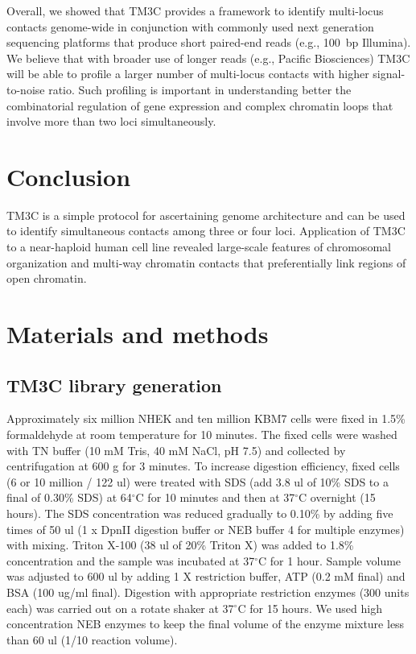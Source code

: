 Overall, we showed that TM3C provides a framework to identify multi-locus
contacts genome-wide in conjunction with commonly used next generation sequencing
platforms that produce short paired-end reads (e.g., 100~bp Illumina).
We believe that with broader use of longer reads (e.g., Pacific Biosciences)
TM3C will be able to profile a larger number of multi-locus contacts
with higher signal-to-noise ratio. Such profiling is important in
understanding better the combinatorial regulation of gene expression
and complex chromatin loops that involve more than
two loci simultaneously.

\section{Conclusion}

TM3C is a simple protocol for ascertaining genome architecture and can
be used to identify simultaneous contacts among three or four
loci. Application of TM3C to a near-haploid human cell line revealed
large-scale features of chromosomal organization and multi-way
chromatin contacts that preferentially link regions of open chromatin.

\section{Materials and methods}
\subsection{TM3C library generation}
Approximately six million NHEK and ten million KBM7 cells were fixed in 1.5\% formaldehyde at
room temperature for 10 minutes. The fixed cells were washed with TN buffer (10 mM Tris, 40
mM NaCl, pH 7.5) and collected by centrifugation at 600 g for 3 minutes. To
increase digestion efficiency, fixed cells (6 or 10 million / 122 ul) were
treated with SDS (add 3.8 ul of 10\% SDS to a final of 0.30\% SDS) at
64$^{\circ}\mathrm{C}$ for 10 minutes and then at 37$^{\circ}\mathrm{C}$
overnight (15 hours). The SDS concentration was reduced gradually to 0.10\% by
adding five times of 50 ul (1 x DpnII digestion buffer or NEB buffer 4 for
multiple enzymes) with mixing. Triton X-100 (38 ul of 20\% Triton X) was added
to 1.8\% concentration and the sample was incubated at 37$^{\circ}\mathrm{C}$
for 1 hour. Sample volume was adjusted to 600 ul by adding 1 X restriction
buffer, ATP (0.2 mM final) and BSA (100 ug/ml final). Digestion with
appropriate restriction enzymes (300 units each) was carried out on a rotate
shaker at 37$^{\circ}\mathrm{C}$ for 15 hours. We used high concentration NEB
enzymes to keep the final volume of the enzyme mixture less than 60 ul (1/10
reaction volume).

